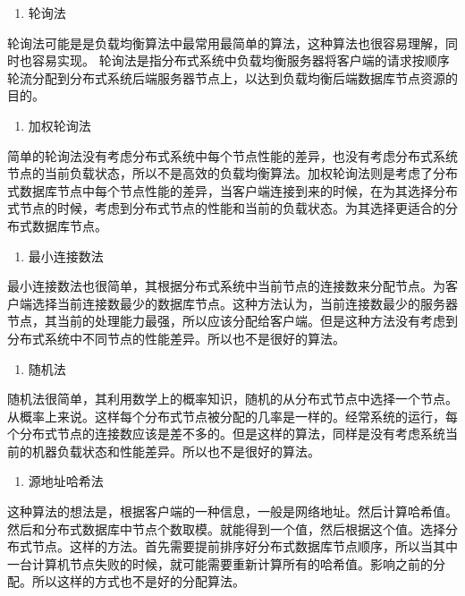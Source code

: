 	\begin{enumerate}
		\item 轮询法
	\end{enumerate}

	轮询法可能是是负载均衡算法中最常用最简单的算法，这种算法也很容易理解，同时也容易实现。 
	轮询法是指分布式系统中负载均衡服务器将客户端的请求按顺序
	轮流分配到分布式系统后端服务器节点上，以达到负载均衡后端数据库节点资源的目的。 	

\begin{enumerate}[resume]
	\item 加权轮询法
\end{enumerate}

	简单的轮询法没有考虑分布式系统中每个节点性能的差异，也没有考虑分布式系统节点的当前负载状态，所以不是高效的负载均衡算法。加权轮询法则是考虑了分布式数据库节点中每个节点性能的差异，当客户端连接到来的时候，在为其选择分布式节点的时候，考虑到分布式节点的性能和当前的负载状态。为其选择更适合的分布式数据库节点。

\begin{enumerate}[resume]
	\item 最小连接数法
\end{enumerate}

	最小连接数法也很简单，其根据分布式系统中当前节点的连接数来分配节点。为客户端选择当前连接数最少的数据库节点。这种方法认为，当前连接数最少的服务器节点，其当前的处理能力最强，所以应该分配给客户端。但是这种方法没有考虑到分布式系统中不同节点的性能差异。所以也不是很好的算法。

\begin{enumerate}[resume]
	\item 随机法
\end{enumerate}

	随机法很简单，其利用数学上的概率知识，随机的从分布式节点中选择一个节点。从概率上来说。这样每个分布式节点被分配的几率是一样的。经常系统的运行，每个分布式节点的连接数应该是差不多的。但是这样的算法，同样是没有考虑系统当前的机器负载状态和性能差异。所以也不是很好的算法。
\begin{enumerate}[resume]
	\item 源地址哈希法
\end{enumerate}

	这种算法的想法是，根据客户端的一种信息，一般是网络地址。然后计算哈希值。然后和分布式数据库中节点个数取模。就能得到一个值，然后根据这个值。选择分布式节点。这样的方法。首先需要提前排序好分布式数据库节点顺序，所以当其中一台计算机节点失败的时候，就可能需要重新计算所有的哈希值。影响之前的分配。所以这样的方式也不是好的分配算法。
	
